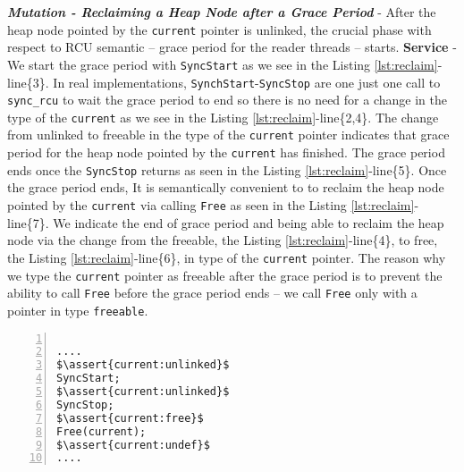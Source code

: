 \textit{\textbf{Mutation - Reclaiming a Heap Node after a Grace Period}} - After the heap node pointed by the \texttt{current} pointer is unlinked, the crucial phase with respect to \textsf{RCU} semantic -- grace period for the reader threads -- starts. \textbf{Service} - We start the grace period with \texttt{SyncStart} as we see in the Listing \ref{lst:reclaim}-line\{3\}. In real implementations, \texttt{SynchStart}-\texttt{SyncStop} are one just one call to \texttt{sync\_rcu} to wait the grace period to end so there is no need for a change in the type of the \texttt{current} as we see in the Listing \ref{lst:reclaim}-line\{2,4\}. The change from \textsf{unlinked} to \textsf{freeable} in the type of the \texttt{current} pointer indicates that grace period for the heap node pointed by the \texttt{current} has finished. The grace period ends once the \texttt{SyncStop} returns as seen in the Listing \ref{lst:reclaim}-line\{5\}. Once the grace period ends, It is semantically convenient to to reclaim the heap node pointed by the \texttt{current} via calling \texttt{Free} as seen in the Listing \ref{lst:reclaim}-line\{7\}. We indicate the end of grace period and being able to reclaim the heap node via the change from the \textsf{freeable}, the Listing \ref{lst:reclaim}-line\{4\}, to \textsf{free}, the Listing \ref{lst:reclaim}-line\{6\}, in type of the \texttt{current} pointer. The reason why we type the \texttt{current} pointer as \textsf{freeable} after the grace period is to prevent the ability to call \texttt{Free} before the grace period ends -- we call \texttt{Free} only with a pointer in type \texttt{freeable}.    
\begin{lstlisting}[caption={Reclaiming a heap node after a grace period},label={lst:reclaim}, numbers=left, numberstyle=\tiny\color{red}, numbersep=5pt]%, basicstyle=\scriptsize]

....
$\assert{current:unlinked}$
SyncStart;
$\assert{current:unlinked}$
SyncStop;
$\assert{current:free}$
Free(current);
$\assert{current:undef}$
....

\end{lstlisting}

